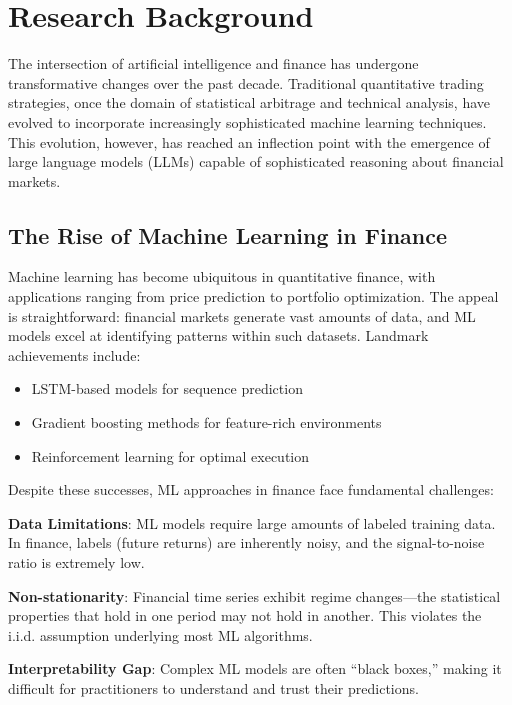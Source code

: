 
\section{Research Background}

The intersection of artificial intelligence and finance has undergone transformative changes over the past decade. Traditional quantitative trading strategies, once the domain of statistical arbitrage and technical analysis, have evolved to incorporate increasingly sophisticated machine learning techniques. This evolution, however, has reached an inflection point with the emergence of large language models (LLMs) capable of sophisticated reasoning about financial markets.

\subsection{The Rise of Machine Learning in Finance}

Machine learning has become ubiquitous in quantitative finance, with applications ranging from price prediction to portfolio optimization. The appeal is straightforward: financial markets generate vast amounts of data, and ML models excel at identifying patterns within such datasets. Landmark achievements include:

\begin{itemize}
    \item LSTM-based models for sequence prediction \cite{hochreiter1997lstm}
    \item Gradient boosting methods for feature-rich environments \cite{ke2017lightgbm}
    \item Reinforcement learning for optimal execution
\end{itemize}

Despite these successes, ML approaches in finance face fundamental challenges:

\textbf{Data Limitations}: ML models require large amounts of labeled training data. In finance, labels (future returns) are inherently noisy, and the signal-to-noise ratio is extremely low.

\textbf{Non-stationarity}: Financial time series exhibit regime changes---the statistical properties that hold in one period may not hold in another. This violates the i.i.d. assumption underlying most ML algorithms.

\textbf{Interpretability Gap}: Complex ML models are often ``black boxes,'' making it difficult for practitioners to understand and trust their predictions.

